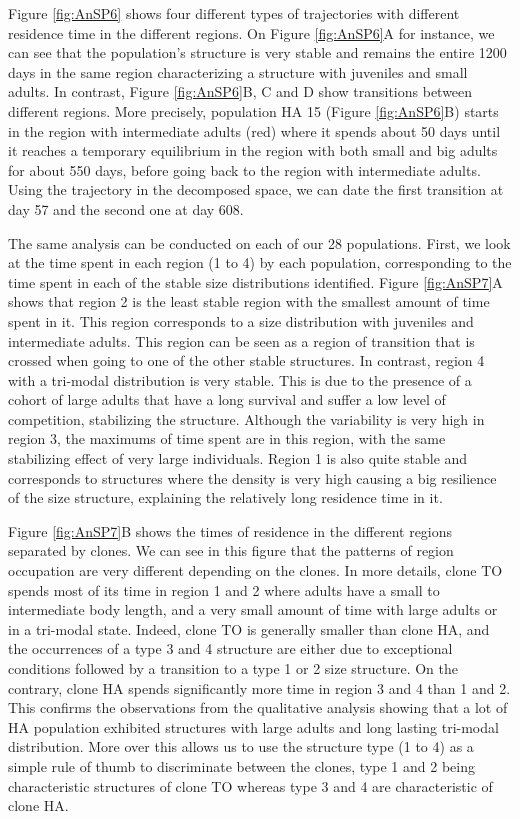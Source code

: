 Figure \ref{fig:AnSP6} shows four different types of trajectories with different residence
time in the different regions. On Figure \ref{fig:AnSP6}A for instance, we can see that the
population’s structure is very stable and remains the entire 1200 days in the
same region characterizing a structure with juveniles and small adults. In
contrast, Figure \ref{fig:AnSP6}B, C and D show transitions between different regions. More
precisely, population HA 15 (Figure \ref{fig:AnSP6}B) starts in the region with intermediate
adults (red) where it spends about 50 days until it reaches a temporary
equilibrium in the region with both small and big adults for about 550 days,
before going back to the region with intermediate adults. Using the trajectory
in the decomposed space, we can date the first transition at day 57 and the
second one at day 608.

The same analysis can be conducted on each of our 28 populations. First, we look
at the time spent in each region (1 to 4) by each population, corresponding to
the time spent in each of the stable size distributions identified. Figure
\ref{fig:AnSP7}A shows that region 2 is the least stable region with the
smallest amount of time spent in it. This region corresponds to a size distribution with juveniles and
intermediate adults. This region can be seen as a region of transition that is
crossed when going to one of the other stable structures. In contrast, region 4
with a tri-modal distribution is very stable. This is due to the presence of a
cohort of large adults that have a long survival and suffer a low level of
competition, stabilizing the structure. Although the variability is very high in
region 3, the maximums of time spent are in this region, with the same
stabilizing effect of very large individuals. Region 1 is also quite stable and
corresponds to structures where the density is very high causing a big
resilience of the size structure, explaining the relatively long residence time
in it.

Figure \ref{fig:AnSP7}B shows the times of residence in the different regions separated by
clones. We can see in this figure that the patterns of region occupation are
very different depending on the clones. In more details, clone TO spends most of
its time in region 1 and 2 where adults have a small to intermediate body
length, and a very small amount of time with large adults or in a tri-modal
state. Indeed, clone TO is generally smaller than clone HA, and the occurrences
of a type 3 and 4 structure are either due to exceptional conditions followed by
a transition to a type 1 or 2 size structure. On the contrary, clone HA spends
significantly more time in region 3 and 4 than 1 and 2. This confirms the
observations from the qualitative analysis showing that a lot of HA population
exhibited structures with large adults and long lasting tri-modal distribution.
More over this allows us to use the structure type (1 to 4) as a simple rule of
thumb to discriminate between the clones, type 1 and 2 being characteristic
structures of clone TO whereas type 3 and 4 are characteristic of clone HA.


